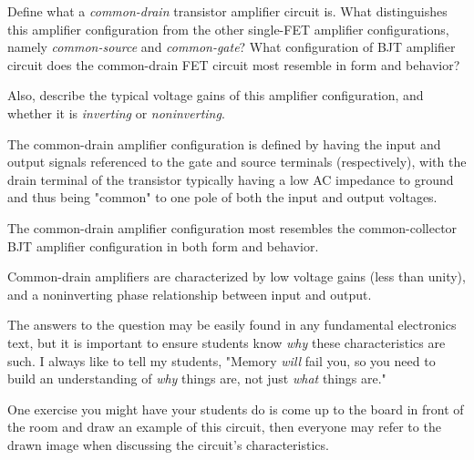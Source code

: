 

Define what a {\it common-drain} transistor amplifier circuit is.  What distinguishes this amplifier configuration from the other single-FET amplifier configurations, namely {\it common-source} and {\it common-gate}?  What configuration of BJT amplifier circuit does the common-drain FET circuit most resemble in form and behavior?

Also, describe the typical voltage gains of this amplifier configuration, and whether it is {\it inverting} or {\it noninverting}.







The common-drain amplifier configuration is defined by having the input and output signals referenced to the gate and source terminals (respectively), with the drain terminal of the transistor typically having a low AC impedance to ground and thus being "common" to one pole of both the input and output voltages. 

The common-drain amplifier configuration most resembles the common-collector BJT amplifier configuration in both form and behavior. 

Common-drain amplifiers are characterized by low voltage gains (less than unity), and a noninverting phase relationship between input and output.







The answers to the question may be easily found in any fundamental electronics text, but it is important to ensure students know {\it why} these characteristics are such.  I always like to tell my students, "Memory {\it will} fail you, so you need to build an understanding of {\it why} things are, not just {\it what} things are."

One exercise you might have your students do is come up to the board in front of the room and draw an example of this circuit, then everyone may refer to the drawn image when discussing the circuit's characteristics.




